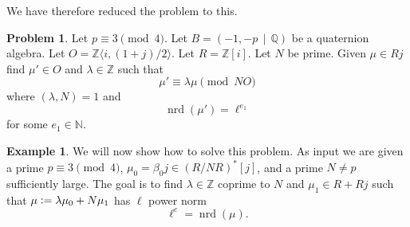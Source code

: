 \documentclass[10pt]{article}
\theoremstyle{plain}
\theoremstyle{definition}
\newtheorem{example}[theorem]{Example}
\newtheorem{problem}[theorem]{Problem}
\newcommand{\op}{\operatorname}
\newcommand{\N}{\mathbb{N}}
\newcommand{\Z}{\mathbb{Z}}
\newcommand{\Q}{\mathbb{Q}}
\newcommand{\nrd}{\op{nrd}}
\begin{document}
We have therefore reduced the problem to this.
\begin{problem}
Let \( p \equiv 3 \pmod{4} \).
Let \( B =  (-1, -p \, \mid \, \Q) \) be a quaternion algebra.
Let \( O = \Z \langle i, (1+j) / 2 \rangle \).
Let \( R = \Z[i] \).
Let \( N \) be prime.
Given \( \mu \in Rj \) find \( \mu' \in O \) and \(\lambda \in \Z \) such that
\[
    \mu' \equiv \lambda \mu \pmod{NO}
\]
where \( (\lambda, N) = 1 \) and
\[
    \nrd(\mu') = \ell^{e_1}
\]
for some \( e_1 \in \N \).
\end{problem}

\begin{example}
    We will now show how to solve this problem.
    As input we are given a prime \( p \equiv 3 \pmod{4} \), \( \mu_0 = \beta_0j \in (R / NR)^*[j] \), and a prime \( N \neq p \) sufficiently large.
    The goal is to find \( \lambda \in \Z \) coprime to \( N \) and \( \mu_1 \in  R + Rj \) such that \( \mu \vcentcolon = \lambda \mu_0 + N \mu_1 \) has \( \ell \) power norm
    \[
        \ell^e = \nrd(\mu).
    \]


\end{example}
\end{document}
